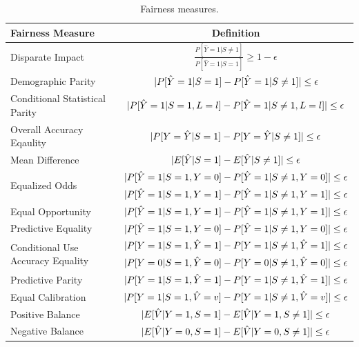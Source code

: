 \documentclass[conference]{IEEEtran}
\begin{document}
\begin{table}[h]
    \centering
    \begin{tabular}{|l|c|} %
        \hline
        \textbf{Fairness Measure} & \textbf{Definition} \\
        \hline
Disparate Impact & $\frac{P[\hat{Y} = 1 | S \neq 1]}{P[\hat{Y} = 1 | S = 1]} \geq 1 - \epsilon$ \\
\hline
Demographic Parity & $\lvert P[\hat{Y} = 1 | S = 1] - P[\hat{Y} = 1 | S \neq 1]\rvert \leq \epsilon$ \\
\hline
Conditional Statistical Parity & $\lvert P[\hat{Y} = 1 | S = 1, L = l] - P[\hat{Y} = 1 | S \neq 1, L = l]\rvert \leq \epsilon$ \\
\hline
Overall Accuracy Eqaulity & $\lvert P[Y = \hat{Y} | S = 1] - P[Y = \hat{Y} | S \neq 1]\rvert \leq \epsilon$ \\
\hline
Mean Difference & $\lvert E[\hat{Y}|S = 1] - E[\hat{Y}|S \neq 1]\rvert \leq \epsilon$ \\
\hline
\multirow{2}{*}{Equalized Odds} & $\lvert P[\hat{Y} = 1 | S = 1, Y = 0] - P[\hat{Y} = 1 | S \neq 1, Y = 0]\rvert \leq \epsilon$ \\
\cline{2-2}
                                & $\lvert P[\hat{Y} = 1 | S = 1, Y = 1] - P[\hat{Y} = 1 | S \neq 1, Y = 1]\rvert \leq \epsilon$ \\
\hline
Equal Opportunity & $\lvert P[\hat{Y} = 1 | S = 1, Y = 1] - P[\hat{Y} = 1 | S \neq 1, Y = 1]\rvert \leq \epsilon$ \\
\hline
Predictive Equality & $\lvert P[\hat{Y} = 1 | S = 1, Y = 0] - P[\hat{Y} = 1 | S \neq 1, Y = 0]\rvert \leq \epsilon$ \\
\hline
\multirow{2}{*}{Conditional Use Accuracy Equality} & $\lvert P[Y = 1 | S = 1, \hat{Y} = 1] - P[Y = 1 | S \neq 1, \hat{Y} = 1]\rvert \leq \epsilon$ \\
\cline{2-2}
                                 & $\lvert P[Y = 0 | S = 1, \hat{Y} = 0] - P[Y = 0 | S \neq 1, \hat{Y} = 0]\rvert \leq \epsilon$ \\
\hline
Predictive Parity & $\lvert P[Y = 1 | S = 1, \hat{Y} = 1] - P[Y = 1 | S \neq 1, \hat{Y} = 1]\rvert \leq \epsilon$ \\
\hline
Equal Calibration & $\lvert P[Y = 1 | S = 1, \hat{V} = v] - P[Y = 1 | S \neq 1, \hat{V} = v]\rvert \leq \epsilon$ \\
\hline
Positive Balance & $\lvert E[\hat{V} | Y = 1, S = 1] - E[\hat{V} | Y = 1, S \neq 1]\rvert \leq \epsilon$ \\
\hline
Negative Balance & $\lvert E[\hat{V} | Y = 0, S = 1] - E[\hat{V} | Y = 0, S \neq 1]\rvert \leq \epsilon$ \\
\hline
    \end{tabular}
    \caption{Fairness measures.}
    \label{tab:measures}
\end{table}
\end{document}
